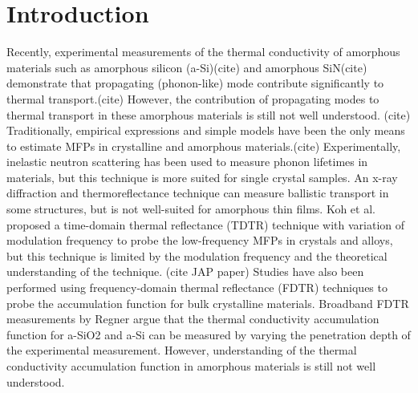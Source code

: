 \documentclass[aps,prb,onecolumn,preprint,superscriptaddress,footinbib,amsmath,amssymb,floatfix]{revtex4}
\begin{document}
\section{\label{S:Introduction}Introduction}


Recently, 
experimental measurements of the thermal conductivity of amorphous 
materials such as amorphous silicon (a-Si)(cite) 
and amorphous SiN(cite)  
demonstrate that 
propagating (phonon-like) mode contribute significantly to thermal 
transport.(cite) However, the contribution of propagating modes to 
thermal 
transport in these amorphous materials is still not well understood.
(cite) 
Traditionally, empirical expressions and
simple models have been the only means
to estimate MFPs in crystalline\cite{holland_analysis_1963} 
and amorphous materials.(cite)   
Experimentally, inelastic neutron scattering has been
used to measure phonon lifetimes in materials,
but this technique is more suited for single crystal samples.
\cite{christianson_phonon_2008} 
An x-ray diffraction and thermoreflectance technique
can measure ballistic transport in some structures, but is 
not well-suited for amorphous thin films.
\cite{highland_ballistic-phonon_2007} 
Koh et al. proposed a time-domain thermal reflectance (TDTR) 
technique with variation of
modulation frequency to probe the low-frequency MFPs in 
crystals and alloys,
\cite{koh_frequency_2007} 
but this technique is limited by the modulation frequency 
and the theoretical understanding of the technique.
(cite JAP paper) 
Studies have also been performed using  
frequency-domain thermal reflectance (FDTR) techniques 
to probe the accumulation function for bulk 
crystalline materials.\cite{minnich_thermal_2011,yang_mean_2013} 
Broadband FDTR measurements by Regner argue that the thermal 
conductivity accumulation function for a-SiO2 and a-Si  
can be measured by varying the penetration depth of the 
experimental measurement.\cite{regner_broadband_2013}
However, understanding 
of the thermal conductivity accumulation function in amorphous 
materials is still not well understood.
\cite{feldman_thermal_1993,cahill_thermal_1994,
feldman_numerical_1999,liu_high_2009,yang_anomalously_2010,
he_thermal_2011}
\end{document}
